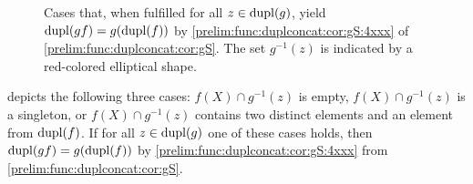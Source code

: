 \begin{figure}[htb]
\begin{subfigure}[c]{0.29\textwidth}
%	
	\end{subfigure}\hfill
	\caption[Cases so that $\dupl{\concat{f}{g}} = g(\dupl{f}$)]{
		Cases that, when fulfilled for all $z \in \dupl{g}$,
		yield $\dupl{\concat{f}{g}} = g(\dupl{f})$
		by \cref{prelim:func:duplconcat:cor:gS:4xxx} of \cref{prelim:func:duplconcat:cor:gS}.
		The set $g^{-1}(z)$ is indicated by a red-colored elliptical shape.}
	\label{prelim:trans:fig:duplconcatingduplf}
\end{figure}

depicts the following three cases: $f(X) \cap g^{-1}(z)$ is empty,
$f(X) \cap g^{-1}(z)$ is a singleton,
or $f(X) \cap g^{-1}(z)$ contains two distinct elements
and an element from $\dupl{f}$. 
If for all $z \in \dupl{g}$ one of these cases holds,
then $\dupl{\concat{f}{g}} = g(\dupl{f})$ by \cref{prelim:func:duplconcat:cor:gS:4xxx} from \cref{prelim:func:duplconcat:cor:gS}.

